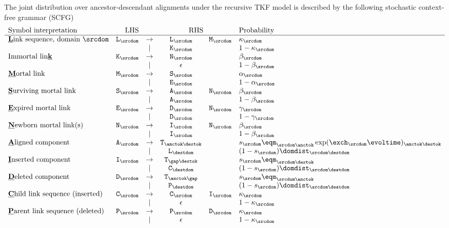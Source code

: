 The joint distribution over ancestor-descendant alignments under the recursive TKF model
is described by the following stochastic context-free grammar (SCFG)
\[
\begin{array}{lrcccl}
\mbox{Symbol interpretation} & \mbox{LHS} & & \multicolumn{2}{c}{\mbox{RHS}} & \mbox{Probability} \\
\hline
\mbox{\underline{\bf L}ink sequence, domain $\srcdom$} &
\ntlinks_\srcdom & \to & \ntlinks_\srcdom & \ntmor_\srcdom & \kappa_\srcdom \\
& & | & \ntimm_\srcdom & & 1 - \kappa_\srcdom \\
\mbox{Immortal lin\underline{\bf k}} &
\ntimm_\srcdom & \to & \ntnew_\srcdom & & \beta_\srcdom \\
& & | & \epsilon & & 1 - \beta_\srcdom \\
\mbox{\underline{\bf M}ortal link} &
\ntmor_\srcdom & \to & \ntsur_\srcdom & & \alpha_\srcdom \\
& & | & \ntexp_\srcdom & & 1 - \alpha_\srcdom \\
\mbox{\underline{\bf S}urviving mortal link} &
\ntsur_\srcdom & \to & \ntaln_\srcdom & \ntnew_\srcdom & \beta_\srcdom \\
& & | & \ntaln_\srcdom & & 1 - \beta_\srcdom \\
\mbox{\underline{\bf E}xpired mortal link} &
\ntexp_\srcdom & \to & \ntdel_\srcdom & \ntnew_\srcdom & \gamma_\srcdom \\
& & | & \ntdel_\srcdom & & 1 - \gamma_\srcdom \\
\mbox{\underline{\bf N}ewborn mortal link(s)} &
\ntnew_\srcdom & \to & \ntins_\srcdom & \ntnew_\srcdom & \beta_\srcdom \\
& & | & \ntins_\srcdom & & 1 - \beta_\srcdom \\
\mbox{\underline{\bf A}ligned component} &
\ntaln_\srcdom & \to & \term_{\anctok\destok} & & \tok_\srcdom \eqm_{\srcdom\anctok} \exp(\exch_\srcdom \evoltime)_{\anctok\destok}\\
& & | & \ntlinks_\destdom & & (1 - \tok_\srcdom) \domdist_{\srcdom\destdom} \\
\mbox{\underline{\bf I}nserted component} &
\ntins_\srcdom & \to & \term_{\gap\destok} & & \tok_\srcdom \eqm_{\srcdom\destok} \\
& & | & \ntchild_\destdom & & (1 - \tok_\srcdom) \domdist_{\srcdom\destdom} \\
\mbox{\underline{\bf D}eleted component} &
\ntdel_\srcdom & \to & \term_{\anctok\gap} & & \tok_\srcdom \eqm_{\srcdom\anctok} \\
& & | & \ntparent_\destdom & & (1 - \tok_\srcdom) \domdist_{\srcdom\destdom} \\
\mbox{\underline{\bf C}hild link sequence (inserted)} &
\ntchild_\srcdom & \to & \ntchild_\srcdom & \ntins_\srcdom & \kappa_\srcdom \\
& & | & \epsilon & & 1 - \kappa_\srcdom \\
\mbox{\underline{\bf P}arent link sequence (deleted)} &
\ntparent_\srcdom & \to & \ntparent_\srcdom & \ntdel_\srcdom & \kappa_\srcdom  \\
& & | & \epsilon & & 1 - \kappa_\srcdom \\
\end{array}
\]

